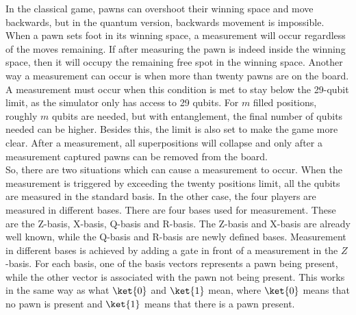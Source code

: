 \documentclass[final,5p,times,twocolumn,authoryear]{elsarticle}
\begin{document}
In the classical game, pawns can overshoot their winning space and move backwards, but in the quantum version, backwards movement is impossible. When a pawn sets foot in its winning space, a measurement will occur regardless of the moves remaining. If after measuring the pawn is indeed inside the winning space, then it will occupy the remaining free spot in the winning space. Another way a measurement can occur is when more than twenty pawns are on the board. A measurement must occur when this condition is met to stay below the 29-qubit limit, as the simulator only has access to 29 qubits. For $m$ filled positions, roughly $m$ qubits are needed, but with entanglement, the final number of qubits needed can be higher. Besides this, the limit is also set to make the game more clear. After a measurement, all superpositions will collapse and only after a measurement captured pawns can be removed from the board. 
\\
So, there are two situations which can cause a measurement to occur. When the measurement is triggered by exceeding the twenty positions limit, all the qubits are measured in the standard basis. In the other case, the four players are measured in different bases. There are four bases used for measurement. These are the Z-basis, X-basis, Q-basis and R-basis. The Z-basis and X-basis are already well known, while the Q-basis and R-basis are newly defined bases. Measurement in different bases is achieved by adding a gate in front of a measurement in the $Z$-basis.  For each basis, one of the basis vectors represents a pawn being present, while the other vector is associated with the pawn not being present. This works in the same way as what $\ket{0}$ and $\ket{1}$ mean, where $\ket{0}$ means that no pawn is present and $\ket{1}$ means that there is a pawn present. 

    
    
\end{document}
